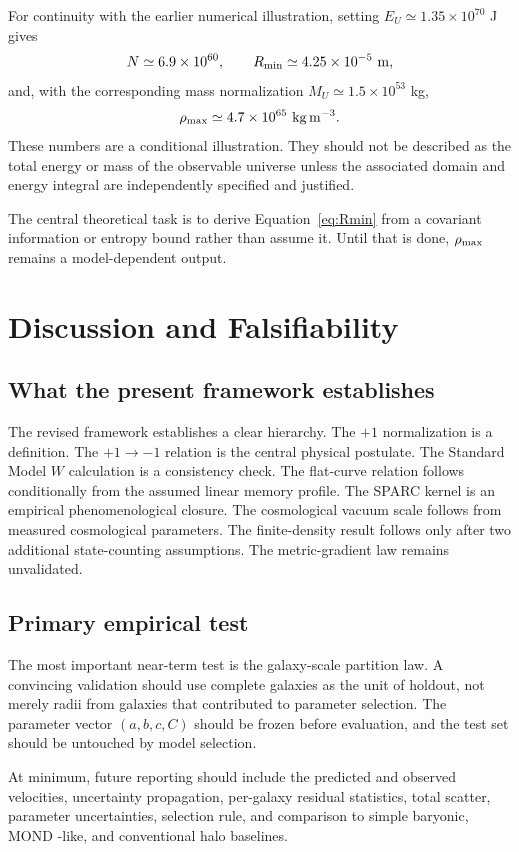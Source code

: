 \documentclass[twocolumn]{aastex631}
\begin{document}
For continuity with the earlier numerical illustration, setting $E_U\simeq1.35\times10^{70}$ J gives
\[
N\simeq6.9\times10^{60},
\qquad
R_{\rm min}\simeq4.25\times10^{-5}\ {\rm m},
\]
and, with the corresponding mass normalization $M_U\simeq1.5\times10^{53}$ kg,
\[
\rho_{\rm max}\simeq4.7\times10^{65}\ {\rm kg\,m^{-3}}.
\]
These numbers are a conditional illustration. They should not be described as the total energy or mass of the observable universe unless the associated domain and energy integral are independently specified and justified.

The central theoretical task is to derive Equation~\eqref{eq:Rmin} from a covariant information or entropy bound rather than assume it. Until that is done, $\rho_{\rm max}$ remains a model-dependent output.

\section{Discussion and Falsifiability}
\subsection{What the present framework establishes}
The revised framework establishes a clear hierarchy. The $+1$ normalization is a definition. The $+1\to-1$ relation is the central physical postulate. The Standard Model $W$ calculation is a consistency check. The flat-curve relation follows conditionally from the assumed linear memory profile. The SPARC kernel is an empirical phenomenological closure. The cosmological vacuum scale follows from measured cosmological parameters. The finite-density result follows only after two additional state-counting assumptions. The metric-gradient law remains unvalidated.

\subsection{Primary empirical test}
The most important near-term test is the galaxy-scale partition law. A convincing validation should use complete galaxies as the unit of holdout, not merely radii from galaxies that contributed to parameter selection. The parameter vector $(a,b,c,C)$ should be frozen before evaluation, and the test set should be untouched by model selection.

At minimum, future reporting should include the predicted and observed velocities, uncertainty propagation, per-galaxy residual statistics, total scatter, parameter uncertainties, selection rule, and comparison to simple baryonic, MOND \cite{Milgrom1983}-like, and conventional halo baselines.
\end{document}
